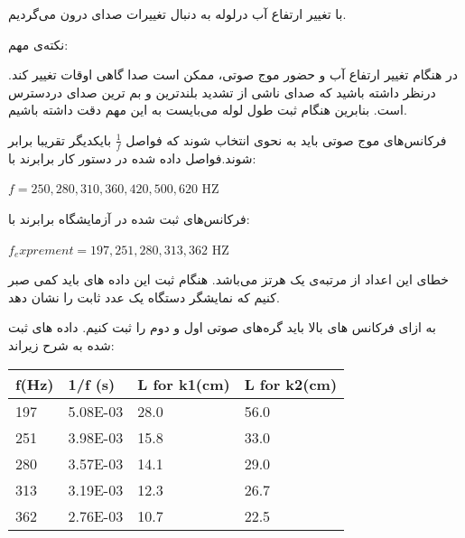\documentclass{article}
\begin{document}
با تغییر ارتفاع آب درلوله به دنبال تغییرات صدای درون می‌گردیم.


نکته‌ی مهم: 

در هنگام تغییر ارتفاع آب و حضور موج صوتی، ممکن است صدا گاهی اوقات تغییر کند. درنظر داشته باشید که صدای ناشی از تشدید بلندترین و بم ترین صدای دردسترس است. بنابرین هنگام ثبت طول لوله می‌بایست به این مهم دقت داشته باشیم.


فرکانس‌های موج صوتی باید به نحوی انتخاب شوند که فواصل $\frac{1}{f}$ بایکدیگر تقریبا برابر شوند.فواصل داده شده در دستور کار برابرند با:
\begin{latin}
$f = 250, 280, 310, 360, 420, 500, 620$ HZ
\end{latin}
\pagebreak

فرکانس‌های ثبت شده در آزمایشگاه برابرند با:
\begin{latin}
$f_exprement = 197, 251, 280, 313, 362$ HZ
\end{latin}

خطای این اعداد از مرتبه‌ی یک هرتز می‌باشد.
هنگام ثبت این داده های باید کمی صبر کنیم که نمایشگر دستگاه یک عدد ثابت را نشان دهد.

به ازای فرکانس های بالا باید گره‌های صوتی اول و دوم را ثبت کنیم. داده های ثبت شده به شرح زیراند:

\begin{latin}
\begin{table}[!ht]
	\centering
	\begin{tabular}{|l|l|l|l|}
		\hline
		f(Hz) & 1/f (s) & L for k1(cm) & L for k2(cm) \\ \hline
		197 & 5.08E-03 & 28.0 & 56.0 \\ \hline
		251 & 3.98E-03 & 15.8 & 33.0 \\ \hline
		280 & 3.57E-03 & 14.1 & 29.0 \\ \hline
		313 & 3.19E-03 & 12.3 & 26.7 \\ \hline
		362 & 2.76E-03 & 10.7 & 22.5 \\ \hline
	\end{tabular}
\end{table}
\end{latin}
\end{document}
